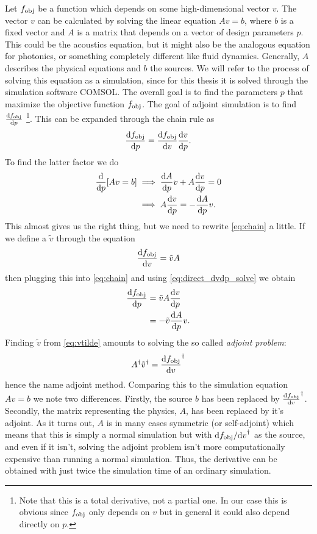 Let $f_\text{obj}$ be a function which depends on some high-dimensional vector $v$.
The vector $v$ can be calculated by solving the linear equation
$A v = b$, where $b$ is a fixed vector and $A$ is a matrix that depends on a
vector of design parameters $p$.
This could be the acoustics equation, but it might also be the analogous
equation for photonics, or something completely different like fluid dynamics.
Generally, $A$ describes the physical equations and $b$ the sources.
We will refer to the process of solving this equation as a simulation, since for
this thesis it is solved through the simulation software COMSOL.
The overall goal is to find the parameters $p$ that maximize the objective
function $f_\text{obj}$.
The goal of adjoint simulation is to find $\diff{\fobj}{p}$%
\footnote{%
	Note that this is a total derivative, not a partial one. In our case this is
	obvious since $f_\text{obj}$ only depends on $v$ but in general it could also
	depend directly on $p$.
}.
This can be expanded through the chain rule as
\begin{equation}\label{eq:chain}
	\diff{\fobj}{p} = \diff{\fobj}{v} \diff{v}{p}.
\end{equation}
To find the latter factor we do
\begin{align}
	\diff{}{p} [Av = b] &\implies \diff{A}{p} v + A \diff{v}{p} = 0\\
						&\implies A\diff{v}{p} = -\diff{A}{p}
						v.\label{eq:direct_dvdp_solve}
\end{align}
This almost gives us the right thing, but we need to rewrite \cref{eq:chain} a
little.
If we define a $\tilde v$ through the equation
\begin{equation}\label{eq:vtilde}
	\diff{\fobj}{v} = \tilde v A
\end{equation}
then plugging this into \cref{eq:chain} and using \cref{eq:direct_dvdp_solve} we
obtain
\begin{align}
	\label{eq:dfdp_vtilde}
	\diff{\fobj}{p} &=
	\tilde v A \diff{v}{p}\\
	&=
	-\tilde v \diff{A}{p} v.
\end{align}
Finding $\tilde v$ from \cref{eq:vtilde} amounts to solving the so called
\emph{adjoint problem}:
\begin{equation}\label{eq:gen_adjoint_problem}
	A^\dagger \tilde v^\dagger = \diff{\fobj}{v}^\dagger
\end{equation}
hence the name adjoint method.
Comparing this to the simulation equation $Av = b$ we note two differences.
Firstly, the source $b$ has been replaced by $\diff{\fobj}{v}^\dagger$.
Secondly, the matrix representing the physics, $A$, has been replaced by it's
adjoint.
As it turns out, $A$ is in many cases symmetric (or self-adjoint) which means that this is simply a normal
simulation but with $\difs{\fobj}{v}^\dagger$ as the source, and even if it
isn't, solving the adjoint problem isn't more computationally expensive than
running a normal simulation.
Thus, the derivative can be obtained with just twice the simulation time
of an ordinary simulation.

